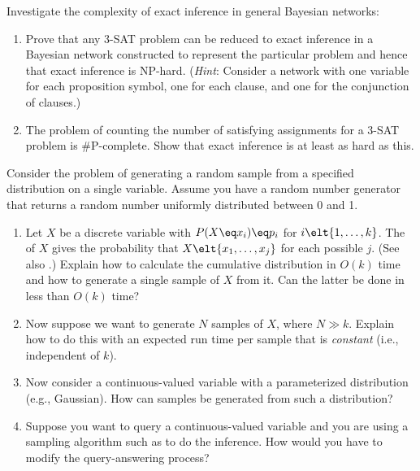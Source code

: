 \begin{exercise}
Investigate the complexity of exact inference in general Bayesian networks:
\begin{enumerate}
\item Prove that any 3-SAT problem can be reduced to exact inference
in a Bayesian network constructed to represent the particular problem
and hence that exact inference is NP-hard. ({\em Hint}: Consider a network
with one variable for each proposition symbol, one for each clause,
and one for the conjunction of clauses.)
\item The problem of counting the number of satisfying assignments for
a 3-SAT problem is \#P-complete. Show that exact
inference is at least as hard as this.
\end{enumerate}
\end{exercise} 



\begin{exercise}
Consider the problem of generating a random sample from a specified
distribution on a single variable. Assume you have a random number
generator that returns a random number uniformly
distributed between 0 and 1.
\begin{enumerate}
\item Let \(X\) be a discrete variable with \(P(X\eq x_i)\eq p_i\)
for \(i\elt\{1,\ldots,k\}\). The  of
\(X\) gives the probability that \(X\elt\{x_1,\ldots,x_j\}\) for each
possible \(j\). (See also .) Explain how to calculate the cumulative distribution in
\(O(k)\) time and how to generate a single sample of \(X\)
from it. Can the latter be done in less than
\(O(k)\) time?

\item Now suppose we want to generate \(N\) samples of \(X\), where \(N\gg k\).
Explain how to do this with an expected run time per sample that is
{\em constant} (i.e., independent of \(k\)).
\item Now consider a continuous-valued variable with a parameterized
distribution (e.g., Gaussian). How can samples be generated from such
a distribution? 
\item Suppose you want to query a continuous-valued variable and you
are using a sampling algorithm such as  to
do the inference. How would you have to modify the query-answering
process?
\end{enumerate}
\end{exercise} 

